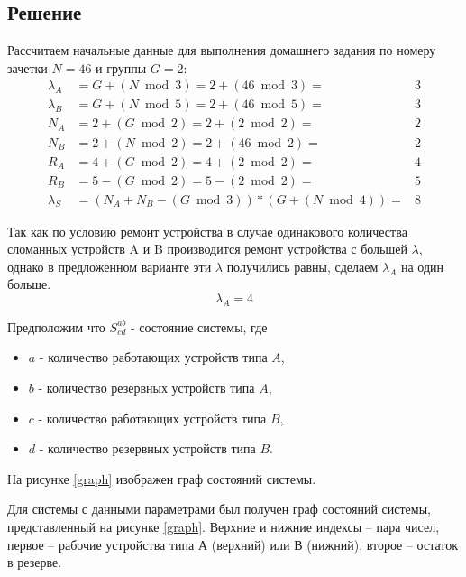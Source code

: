 \subsection{Решение}

Рассчитаем начальные данные для выполнения домашнего задания по номеру зачетки $N = 46$ и группы $G = 2$:
\[
\begin{matrix}
    \lambda_A & = G + (N \bmod 3) = 2 + (46 \bmod 3) = & 3 \\
    \lambda_B & = G + (N \bmod 5) = 2 + (46 \bmod 5) = & 3 \\
    N_A & = 2 + (G \bmod 2) = 2 + (2 \bmod 2) = & 2 \\
    N_B & = 2 + (N \bmod 2) = 2 + (46 \bmod 2) = & 2 \\
    R_A & = 4 + (G \bmod 2) = 4 + (2 \bmod 2) = & 4 \\
    R_B & = 5 - (G \bmod 2) = 5 - (2 \bmod 2) = & 5 \\
    \lambda_S & = (N_A + N_B - (G \bmod 3)) * (G + (N \bmod 4)) = & 8
\end{matrix}
\]


    Так как по условию ремонт устройства в случае одинакового количества сломанных устройств A и B производится ремонт устройства
    с большей $\lambda$, однако в предложенном варианте эти $\lambda$ получились равны, сделаем $\lambda_A$ на один больше.
    \[\lambda_A = 4\]


Предположим что $S^{ab}_{cd}$ - состояние системы, где
\begin{itemize}
    \item $a$ - количество работающих устройств типа $A$,
    \item $b$ - количество резервных устройств типа $A$,
    \item $c$ - количество работающих устройств типа $B$,
    \item $d$ - количество резервных устройств типа $B$.
\end{itemize}
На рисунке \ref{graph} изображен граф состояний системы.

Для системы с данными параметрами был получен граф состояний системы, представленный на рисунке \ref{graph}. Верхние и нижние индексы -- пара чисел, первое -- рабочие устройства типа $А$ (верхний) или $В$ (нижний), второе -- остаток в резерве.


